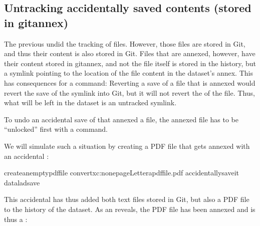 \subsection{Untracking accidentally saved contents (stored in git\sphinxhyphen{}annex)}
\label{\detokenize{basics/101-137-history:untracking-accidentally-saved-contents-stored-in-git-annex}}\label{\detokenize{basics/101-137-history:index-3}}
\sphinxAtStartPar
The previous  undid the tracking of  files.
However, those files are stored in Git, and thus their content
is also stored in Git. Files that are annexed, however, have
their content stored in git\sphinxhyphen{}annex, and not the file itself is stored
in the history, but a symlink pointing to the location of the file
content in the dataset’s annex. This has consequences for
a  command: Reverting a save of a file that is
annexed would revert the save of the symlink into Git, but it will
not revert the  of the file.
Thus, what will be left in the dataset is an untracked symlink.

\sphinxAtStartPar
To undo an accidental save of that annexed a file, the annexed file
has to be “unlocked” first with a  command.

\sphinxAtStartPar
We will simulate such a situation by creating a PDF file that
gets annexed with an accidental :

\begin{sphinxVerbatim}[commandchars=\\\{\}]
createanemptypdffile
convertxc:none\PYGZhy{}pageLetterapdffile.pdf
accidentallysaveit
dataladsave
\end{sphinxVerbatim}

\sphinxAtStartPar
This accidental  has thus added both text files
stored in Git, but also a PDF file to the history of the dataset.
As an  reveals, the PDF file has been annexed and is
thus a {\hyperref[\detokenize{glossary:term-symlink}]{}}:

